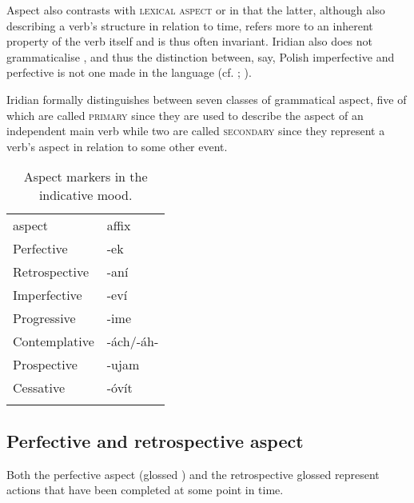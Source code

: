 Aspect also contrasts with {\scshape lexical aspect} or
 in that the latter,
although also describing a verb's structure in relation to time, refers more to
an inherent property of the verb itself and is thus often invariant. Iridian
also does not grammaticalise , and thus the distinction
between, say, Polish imperfective   and
perfective   is not one made in the
language (cf. \cite[9--26]{richardson2007}; \cite{comrie1976}).

Iridian formally distinguishes between seven classes of grammatical aspect, five
of which are called {\scshape primary} since they are used to describe the
aspect of an independent main verb while two are called {\scshape secondary}
since they represent a verb's aspect in relation to some other event.

\begin{table}
	\footnotesize\sffamily
	\caption{Aspect markers in the indicative mood.}
	\medskip
	\begin{tabu} to 0.5
		\toprule \addlinespace
		{\sc aspect}	& {\sc affix}\\ \addlinespace
		\midrule \addlinespace
		Perfective		& {-ek}\\ \addlinespace
		Retrospective	& {-aní}\\ \addlinespace
		Imperfective	& {-eví}\\ \addlinespace
		Progressive		& {-ime} \\ \addlinespace
		Contemplative	& {-ách/-áh-}\\ \addlinespace
		Prospective		& {-ujam}\\ \addlinespace
		Cessative		& {-óvít}\\ \addlinespace
		\bottomrule
	\end{tabu}

\end{table}


\subsection{Perfective and retrospective
aspect}\label{sec:perfective-retrospective}

Both the perfective aspect (glossed \Pf{}) and the retrospective {glossed
\Ret{}} represent actions that have been completed at some point in time.

